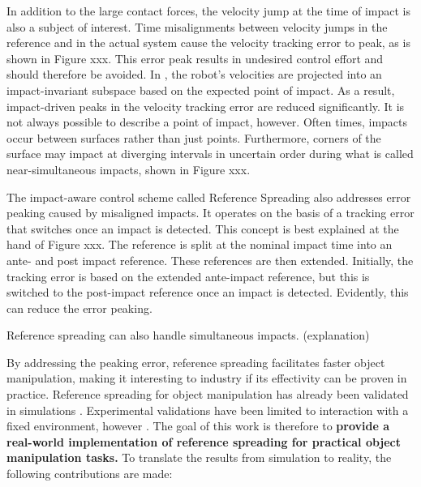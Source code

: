 \documentclass[a4paper, 10pt, conference]{ieeeconf}
\begin{document}
    In addition to the large contact forces, the velocity jump at the time of impact is also a subject of interest. Time misalignments between velocity jumps in the reference and in the actual system cause the velocity tracking error to peak\cite{biemondTrackingControlMechanical2012}, as is shown in Figure xxx. This error peak results in undesired control effort and should therefore be avoided. In \cite{yangImpactInvariantControl2021}, the robot's velocities are projected into an impact-invariant subspace based on the expected point of impact. As a result, impact-driven peaks in the velocity tracking error are reduced significantly. It is not always possible to describe a point of impact, however. Often times, impacts occur between surfaces rather than just points. Furthermore, corners of the surface may impact at diverging intervals in uncertain order during what is called near-simultaneous impacts, shown in Figure xxx.

    The impact-aware control scheme called Reference Spreading \cite{sacconSensitivityAnalysisHybrid2014} also addresses error peaking caused by misaligned impacts. It operates on the basis of a tracking error that switches once an impact is detected. This concept is best explained at the hand of Figure xxx. The reference is split at the nominal impact time into an ante- and post impact reference. These references are then extended. Initially, the tracking error is based on the extended ante-impact reference, but this is switched to the post-impact reference once an impact is detected. Evidently, this can reduce the error peaking.

    Reference spreading can also handle simultaneous impacts. \cite{vansteenRobotControlSimultaneous2021} (explanation)

    By addressing the peaking error, reference spreading facilitates faster object manipulation, making it interesting to industry if its effectivity can be proven in practice. Reference spreading for object manipulation has already been validated in simulations \cite{vansteenRobotControlSimultaneous2021,zwartImpactAwareLearningDemonstration2019}. Experimental validations have been limited to interaction with a fixed environment, however \cite{rijnenReferenceSpreadingTracking2020,uitendaalTeachingRobotsInteraction2022}. The goal of this work is therefore to \textbf{provide a real-world implementation of reference spreading for practical object manipulation tasks.} To translate the results from simulation to reality, the following contributions are made:
\end{document}
